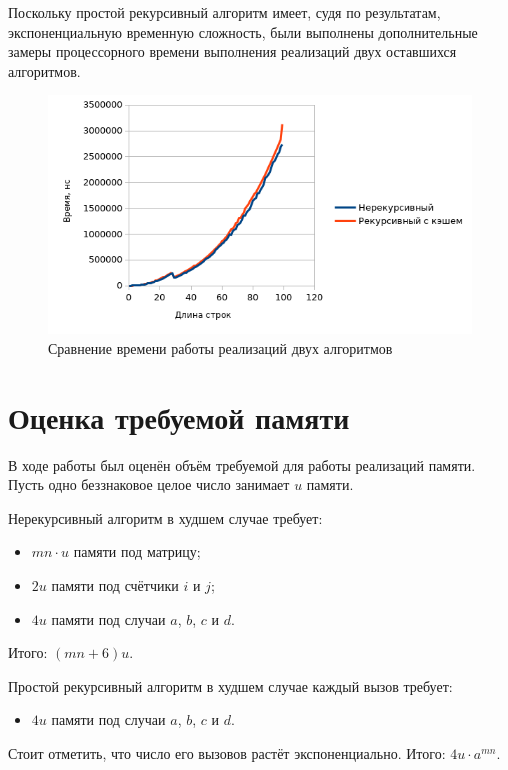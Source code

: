 \documentclass{report}
\begin{document}
Поскольку простой рекурсивный алгоритм имеет, судя по результатам,
экспоненциальную временную сложность, были выполнены дополнительные
замеры процессорного времени выполнения реализаций двух оставшихся
алгоритмов.

\begin{figure}[ht]
    \centering
    \includegraphics[width=\textwidth]{plt-02.png}
    \caption{Сравнение времени работы реализаций двух алгоритмов}
\end{figure}

\section{Оценка требуемой памяти}

В ходе работы был оценён объём требуемой для работы реализаций
памяти. Пусть одно беззнаковое целое число занимает $u$ памяти.

Нерекурсивный алгоритм в худшем случае требует:

\begin{itemize}
    \item $mn \cdot u$ памяти под матрицу;
    \item $2u$ памяти под счётчики $i$ и $j$;
    \item $4u$ памяти под случаи $a$, $b$, $c$ и $d$.
\end{itemize}

Итого: $(mn + 6)u$.

Простой рекурсивный алгоритм в худшем случае каждый вызов требует:

\begin{itemize}
    \item $4u$ памяти под случаи $a$, $b$, $c$ и $d$.
\end{itemize}

Стоит отметить, что число его вызовов растёт экспоненциально.
Итого: $4u \cdot a^{mn}$.
\end{document}
